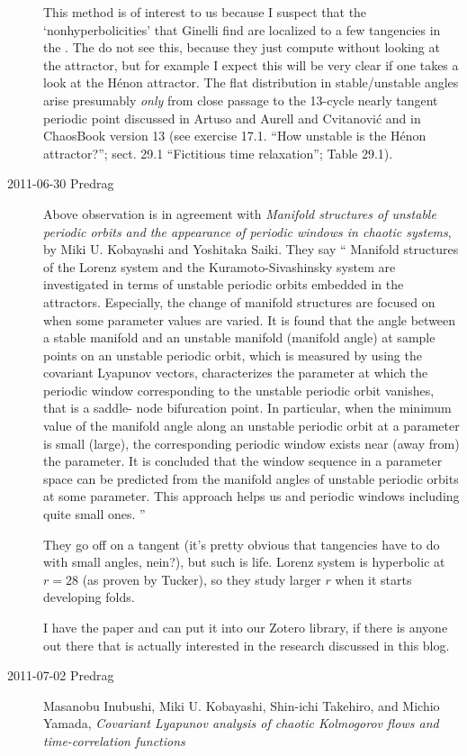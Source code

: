 \begin{description}
This method is of interest to us because I suspect that the `nonhyperbolicities'
that Ginelli\etal{} find are localized to a few tangencies
in the \statesp. The do not see this, because they just compute without looking
at the attractor, but for example I expect this will be very clear if one takes a
look at the H\'enon attractor. The flat distribution in stable/unstable angles
arise presumably {\em only} from close passage to the 13-cycle nearly tangent
periodic point discussed in
Artuso and Aurell and Cvitanovi{\'{c}}
and in ChaosBook version 13
(see exercise 17.1. ``How unstable is the H\'enon attractor?'';
sect. 29.1 ``Fictitious time relaxation'';
Table 29.1).

\item[2011-06-30 Predrag] Above observation is in agreement with
\emph{Manifold structures of unstable periodic orbits and the appearance of periodic
windows in chaotic systems},
by Miki U. Kobayashi and Yoshitaka Saiki.
They say
``
Manifold structures of the Lorenz system and the Kuramoto-Sivashinsky
system are investigated in terms of unstable periodic orbits embedded in
the attractors. Especially, the change of manifold structures are focused
on when some parameter values are varied. It is found that the angle
between a stable manifold and an unstable manifold (manifold angle) at
sample points on an unstable periodic orbit, which is measured by using
the covariant Lyapunov vectors, characterizes the parameter at which the
periodic window corresponding to the unstable periodic orbit vanishes,
that is a saddle- node bifurcation point. In particular, when the minimum
value of the manifold angle along an unstable periodic orbit at a
parameter is small (large), the corresponding periodic window exists near
(away from) the parameter. It is concluded that the window sequence in a
parameter space can be predicted from the manifold angles of unstable
periodic orbits at some parameter. This approach helps us and periodic
windows including quite small ones.
''

They go off on a tangent (it's pretty obvious that tangencies have to do
with small angles, nein?), but such is life.
Lorenz system is hyperbolic at $r = 28$ (as proven by Tucker),
so they study larger $r$ when it starts developing folds.

I have the paper and can put it into our Zotero library, if there is
anyone out there that is actually interested in the research discussed in
this blog.

\item[2011-07-02 Predrag]
Masanobu Inubushi, Miki U. Kobayashi, Shin-ichi Takehiro,
and Michio Yamada,
\emph{Covariant {Lyapunov} analysis of chaotic {Kolmogorov} flows
and time-correlation functions}


\end{description}
